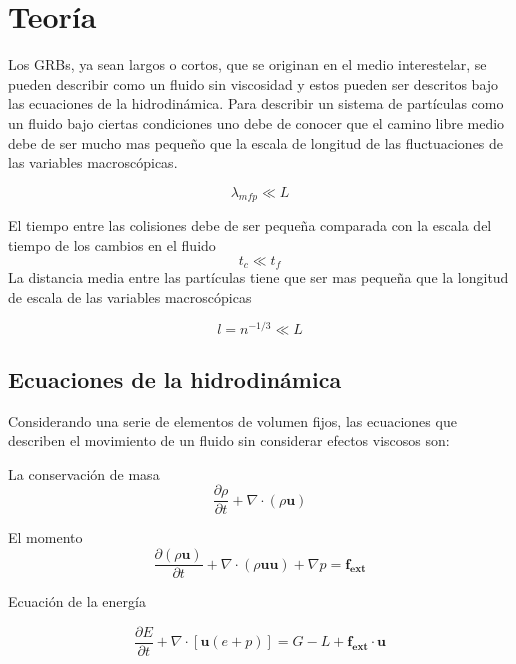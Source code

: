 \documentclass[12pt,a4paper]{book}
\begin{document}
\chapter{Teoría}

Los GRBs, ya sean largos o cortos, que se originan en el medio interestelar, se pueden describir como un fluido sin viscosidad y estos pueden ser descritos bajo
las ecuaciones de la hidrodinámica.
Para describir un sistema de partículas como un fluido bajo ciertas condiciones uno debe de conocer que el camino libre medio debe de ser mucho mas pequeño que la escala de longitud de las fluctuaciones de las variables macroscópicas.

\begin{equation}
\lambda_{mfp} \ll L
\end{equation}

El tiempo entre las colisiones debe de ser pequeña comparada con la escala del tiempo de los cambios en el fluido
\begin{equation}
t_{c} \ll t_f
\end{equation}
La distancia media entre las partículas tiene que ser mas pequeña que la longitud de escala de las variables macroscópicas

\begin{equation}
l = n^{-1/3} \ll L
\end{equation}

\section{Ecuaciones de la hidrodinámica}


Considerando una serie de elementos de volumen fijos, las ecuaciones que describen el movimiento de un fluido sin considerar efectos viscosos son:

La conservación de masa
\begin{equation} \label{conservación_masa_hidrodinamica}
\dfrac{\partial \rho }{\partial t} + \nabla \cdot \left( \rho \mathbf{u} \right)
\end{equation}

El momento
\begin{equation}  \label{conservacion_momento_hidrodinamica}
\dfrac{\partial \left( \rho \mathbf{u} \right) }{\partial t}+ \nabla \cdot \left( \rho \mathbf{u u} \right) + \nabla p = \mathbf{f_{ext}}
\end{equation}

Ecuación de la energía

\begin{equation} \label{conservacion_energia_hidrodinamica}
\dfrac{\partial E }{\partial t} + \nabla \cdot \left[ \mathbf{u} \left( e+p \right) \right] =G-L+\mathbf{f_{ext} \cdot \mathbf{u}}
\end{equation}
\end{document}
